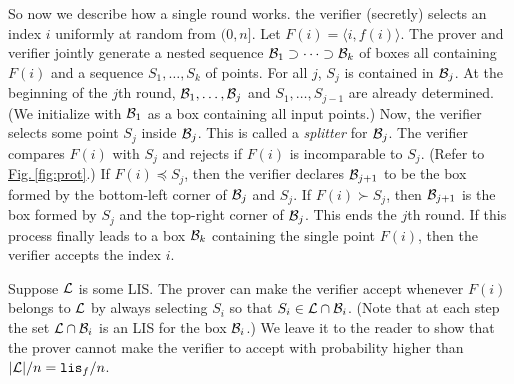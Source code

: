 \documentclass{acmsmall}
\newcommand{\cB}{{\cal B}}
\newcommand{\cL}{{\cal L}}
\newcommand{\Fig}[1]{\hyperref[fig:#1]{Fig.\,\ref*{fig:#1}}} %
\newcommand{\lis}{{\tt lis}}
\newcommand{\maxval}{{\tt valbound}}
\begin{document}
So now we describe how a single round works.  the verifier (secretly) selects an index $i$ uniformly at random from  $(0,n]$.
Let $F(i) = \langle i,f(i) \rangle$.
The prover and verifier jointly generate a nested sequence $\cB_1 \supset \cdots \supset \cB_k$ of boxes
all containing $F(i)$
and a sequence $S_1,\ldots,S_k$ of points. For all $j$, $S_j$ is contained in $\cB_j$.
At the beginning of the $j$th round, $\cB_1,\ldots,\cB_j$ and $S_1,\ldots,S_{j-1}$
are already determined. (We initialize with $\cB_1$ as a box
containing all input points.) Now, the verifier selects some point $S_j$ inside $\cB_j$.
This is called a {\em splitter} for $\cB_j$. The verifier compares $F(i)$ with $S_j$
and rejects if $F(i)$ is incomparable to $S_j$. (Refer to \Fig{prot}.) If $F(i) \preceq S_j$,
then the verifier declares $\cB_{j+1}$ to be the box formed by the bottom-left corner of $\cB_j$ and $S_j$.
If $F(i) \succ S_j$, then $\cB_{j+1}$ is the box formed by $S_j$ and the top-right corner of $\cB_j$.
This ends the $j$th round. 
If this process finally leads to a box $\cB_k$ containing the single point $F(i)$, then
the verifier accepts the index $i$.
%
%
%
%
%

Suppose $\cL$ is some LIS. The prover can make the verifier accept whenever $F(i)$ belongs to $\cL$
by always selecting $S_i$ so that $S_i \in \cL \cap \cB_i$.  (Note that at each step the set $\cL \cap \cB_i$
is an LIS for the box $\cB_i$.) We leave it to the reader to show that
the prover cannot make the verifier to accept with probability higher than $|\cL|/n = \lis_f/n$.
\end{document}

